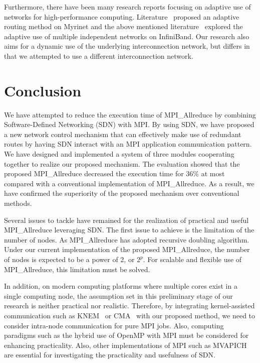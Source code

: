Furthermore, there have been many research reports focusing on adaptive
use of networks for high-performance computing. Literature~\autocite{Geoffray2008}
proposed an adaptive routing method on Myrinet and the above mentioned
literature~\autocite{Jiuxing2004} explored the adaptive use of multiple
independent networks on InfiniBand. Our research also aims for a dynamic use
of the underlying interconnection network, but differs in that we attempted to
use a different interconnection network.

\section{Conclusion}\label{sec:iii-conclusion}

We have attempted to reduce the execution time of
MPI\_Allreduce by combining Software-Defined Networking (SDN)
with MPI\@. By using SDN, we have proposed a new network control mechanism
that can effectively make use of redundant routes by having SDN interact
with an MPI application communication pattern. We have designed and
implemented a system of three modules cooperating together to realize
our proposed mechanism. The evaluation showed that the proposed
MPI\_Allreduce decreased the execution time for 36\% at most
compared with a conventional implementation of MPI\_Allreduce.
As a result, we have confirmed the superiority of the proposed mechanism
over conventional methods.

Several issues to tackle have remained for the realization of practical
and useful MPI\_Allreduce leveraging SDN\@. The first issue to
achieve is the limitation of the number of nodes. As
MPI\_Allreduce has adopted recursive doubling algorithm. Under
our current implementation of the proposed MPI\_Allreduce, the
number of nodes is expected to be a power of 2, or \(2^p\). For scalable
and flexible use of MPI\_Allreduce, this limitation must be
solved.

In addition, on modern computing platforms where multiple cores exist in
a single computing node, the assumption set in this preliminary stage of
our research is neither practical nor realistic. Therefore, by
integrating kernel-assisted communication such as KNEM~\autocite{Goglin2013}
or CMA~\autocite{cma} with our proposed method, we need to consider
intra-node communication for pure MPI jobs. Also, computing paradigms
such as the hybrid use of OpenMP with MPI must be considered for
enhancing practicality. Also, other implementations of MPI such as
MVAPICH~\autocite{mvapich} are essential for investigating the practicality
and usefulness of SDN\@.

